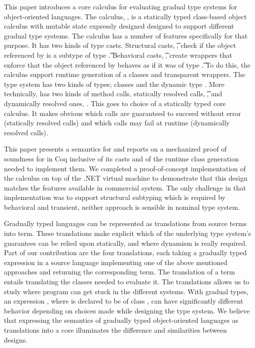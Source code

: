 \documentclass[runnningheads]{tex/llncs}
\begin{document}
This paper introduces a core calculus for evaluating gradual type systems
for object-oriented languages. The calculus, \kafka, is a statically typed
class-based object calculus with mutable state expressly designed designed
to support different gradual type systems. The calculus has a number of
features specifically for that purpose. It has two kinds of type casts.
Structural casts, \SubCast\t\a, check if the object referenced by \a is a
subtype of type \t.  Behavioral casts, \BehCast\t\a, create wrappers that
enforce that the object referenced by \a behaves as if it was of type \t.
To do this, the calculus support runtime generation of a classes and
transparent wrappers.  The \kafka type system has two kinds of types;
classes and the dynamic type \any.  More technically, \kafka has two kinds
of method calls, statically resolved calls, \KCall\a\m\x\t\tp, and
dynamically resolved ones, \DynCall\a\m\x. This goes to choice of a
statically typed core calculus. It makes obvious which calls are guaranteed
to succeed without error (statically resolved calls) and which calls may
fail at runtime (dynamically resolved calls).

This paper presents a semantics for \kafka and reports on a mechanized proof
of soundness for \kafka in Coq inclusive of its casts and of the runtime
class generation needed to implement them.  We completed a proof-of-concept
implementation of the calculus on top of the .NET virtual machine to
demonstrate that this design matches the features available in commercial
system. The only challenge in that implementation was to support structural
subtyping which is required by behavioral and transient, neither approach is
sensible in nominal type system.

Gradually typed languages can be represented as translations from source
terms into \kafka term.  These translations make explicit which of the
underlying type system's guarantees can be relied upon statically, and where
dynamism is really required. Part of our contribution are the four
translations, each taking a gradually typed expression \HT\e\T in a source
language implementing one of the above mentioned approaches and returning
the corresponding \kafka term. The translation of a term entails translating
the classes needed to evaluate it.  The translations allows us to study
where program can get stuck in the different systems.  With gradual types,
an expression \Call\x\m\e, where \x is declared to be of class \C, can have
significantly different behavior depending on choices made while designing
the type system. We believe that expressing the semantics of gradually typed
object-oriented languages as translations into a core illuminates the
difference and similarities between designs.
\end{document}
